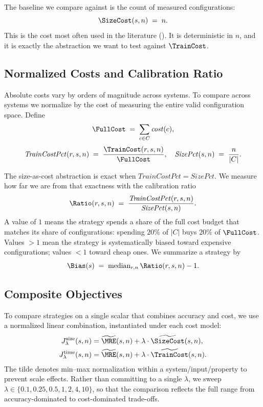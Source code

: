 The baseline we compare against is the count of measured configurations:
\begin{equation}
\SizeCost(s,n)\;=\;n.
\label{eq:sizecost}
\end{equation}
This is the cost most often used in the literature
(). It is deterministic in $n$, and it is exactly
the abstraction we want to test against $\TrainCost$.

\subsection{Normalized Costs and Calibration Ratio}
\label{subsec:normalized-costs}

Absolute costs vary by orders of magnitude across systems. To compare
across systems we normalize by the cost of measuring the entire valid
configuration space. Define
\begin{equation}
\FullCost\;=\;\sum_{c\in C} \mathit{cost}(c),
\label{eq:fullcost}
\end{equation}
\begin{equation}
\mathit{TrainCostPct}(r,s,n)\;=\;\frac{\TrainCost(r,s,n)}{\FullCost},\quad
\mathit{SizePct}(s,n)\;=\;\frac{n}{|C|}.
\label{eq:pct}
\end{equation}

The size-as-cost abstraction is exact when
$\mathit{TrainCostPct}=\mathit{SizePct}$. We measure how far we are from
that exactness with the calibration ratio
\begin{equation}
\Ratio(r,s,n)\;=\;\frac{\mathit{TrainCostPct}(r,s,n)}{\mathit{SizePct}(s,n)}.
\label{eq:ratio}
\end{equation}
A value of $1$ means the strategy spends a share of the full cost budget
that matches its share of configurations: spending $20\%$ of $|C|$ buys
$20\%$ of $\FullCost$. Values $>1$ mean the strategy is systematically
biased toward expensive configurations; values $<1$ toward cheap ones. We
summarize a strategy by
\begin{equation}
\Bias(s)\;=\;\mathrm{median}_{r,n}\,\Ratio(r,s,n) - 1.
\label{eq:bias}
\end{equation}

\subsection{Composite Objectives}
\label{subsec:composite}

To compare strategies on a single scalar that combines accuracy and cost, we
use a normalized linear combination, instantiated under each cost model:
\begin{align}
J^{\text{size}}_{\lambda}(s,n) &= \widetilde{\MRE}(s,n) + \lambda\cdot\widetilde{\SizeCost}(s,n), \label{eq:Jsize}\\
J^{\text{time}}_{\lambda}(s,n) &= \widetilde{\MRE}(s,n) + \lambda\cdot\widetilde{\TrainCost}(s,n). \label{eq:Jtime}
\end{align}
The tilde denotes min--max normalization within a system/input/property to
prevent scale effects. Rather than committing to a single $\lambda$, we
sweep $\lambda\in\{0.1,0.25,0.5,1,2,4,10\}$, so that the comparison reflects
the full range from accuracy-dominated to cost-dominated trade-offs.


